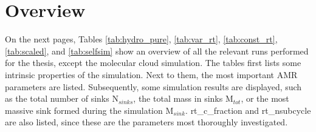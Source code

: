 
\chapter{Overview} %

\label{sec:Overview}

On the next pages, Tables \ref{tab:hydro_pure}, \ref{tab:var_rt}, \ref{tab:const_rt}, \ref{tab:scaled}, and \ref{tab:selfsim} show an overview of all the relevant runs performed for the thesis, except the molecular cloud simulation.
The tables first lists some intrinsic properties of the simulation.
Next to them, the most important AMR parameters are listed.
Subsequently, some simulation results are displayed, such as the total number of sinks N$_{sinks}$, the total mass in sinks M$_{tot}$, or the most massive sink formed during the simulation M$_{sink}$.
rt\_c\_fraction and rt\_nsubcycle are also listed, since these are the parameters most thoroughly investigated.

\newpage
\thispagestyle{plain}
\begin{landscape}
 
 
 
\end{landscape}

\newpage
\thispagestyle{plain}
\begin{landscape}
 
 
\end{landscape}

